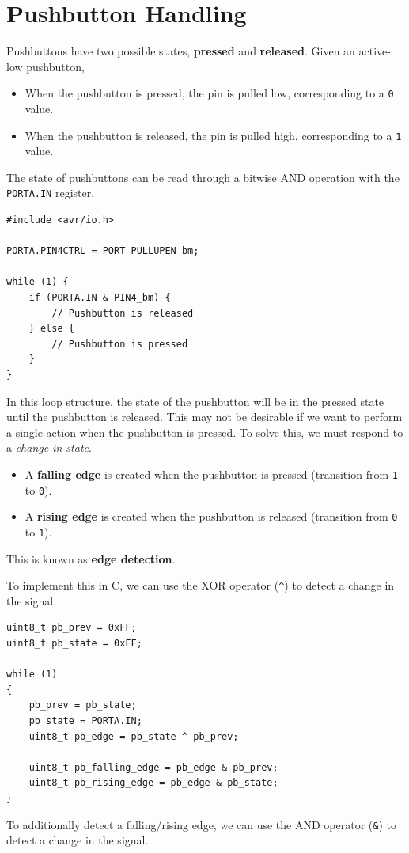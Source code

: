 \documentclass{report}
\begin{document}
\section{Pushbutton Handling}
Pushbuttons have two possible states, \textbf{pressed} and \textbf{released}. Given an active-low pushbutton,
\begin{itemize}
    \item When the pushbutton is pressed, the pin is pulled low, corresponding to a \texttt{0} value.
    \item When the pushbutton is released, the pin is pulled high, corresponding to a \texttt{1} value.
\end{itemize}
The state of pushbuttons can be read through a bitwise AND operation with the \texttt{PORTA.IN} register.
\begin{verbatim}
#include <avr/io.h>

PORTA.PIN4CTRL = PORT_PULLUPEN_bm;

while (1) {
    if (PORTA.IN & PIN4_bm) {
        // Pushbutton is released
    } else {
        // Pushbutton is pressed
    }
}
\end{verbatim}
In this loop structure, the state of the pushbutton will be in the pressed state until the pushbutton is released.
This may not be desirable if we want to perform a single action when the pushbutton is pressed.
To solve this, we must respond to a \textit{change in state}.
\begin{itemize}
    \item A \textbf{falling edge} is created when the pushbutton is pressed (transition from \texttt{1} to \texttt{0}).
    \item A \textbf{rising edge} is created when the pushbutton is released (transition from \texttt{0} to \texttt{1}).
\end{itemize}
This is known as \textbf{edge detection}.

To implement this in C, we can use the XOR operator (\texttt{^}) to detect a change in the signal.
\begin{verbatim}
uint8_t pb_prev = 0xFF;
uint8_t pb_state = 0xFF;

while (1)
{
    pb_prev = pb_state;
    pb_state = PORTA.IN;
    uint8_t pb_edge = pb_state ^ pb_prev;

    uint8_t pb_falling_edge = pb_edge & pb_prev;
    uint8_t pb_rising_edge = pb_edge & pb_state;
}
\end{verbatim}
To additionally detect a falling/rising edge, we can use the AND operator (\texttt{&}) to detect a change in the signal.
\end{document}

